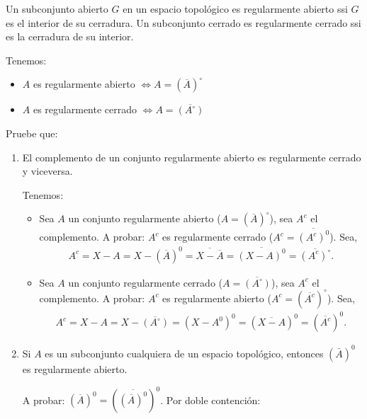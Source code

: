 \begin{problema}
    Un subconjunto abierto $G$ en un espacio topológico es regularmente abierto ssi $G$ es el interior de su cerradura. Un subconjunto cerrado es regularmente cerrado ssi es la cerradura de su interior. 
    \begin{cajita}
        Tenemos: 
        \begin{itemize}
            \item $A$ es regularmente abierto $\iff A= (\overline{A})^\circ$
            \item $A$ es regularmente cerrado $\iff A= \overline{(A^\circ)}$
        \end{itemize}
    \end{cajita}
    
    Pruebe que:
    \begin{enumerate}
        \item El complemento de un conjunto regularmente abierto es regularmente cerrado y viceversa.
        \begin{dem}
            Tenemos: 
            \begin{itemize}
                \item Sea $A$ un conjunto regularmente abierto ($A=(\overline{A})^\circ$), sea $A^c$ el complemento. A probar: $A^c$ es regularmente cerrado ($A^c=\overline{(A^c)^0}$). Sea, 
                \begin{align*}
                    A^c = X-A = X-(\overline{A})^0=\overline{X-\overline{A}}=\overline{(X-A)^0}=\overline{(A^c)^\circ}.
                \end{align*}
                \item Sea $A$ un conjunto regularmente cerrado ($A= \overline{(A^\circ)}$), sea $A^c$ el complemento. A probar: $A^c$ es regularmente abierto ($A^c= (\overline{A^c})^\circ$). Sea, 
                \begin{align*}
                    A^c=X-A=X-\overline{(A^\circ)} =(X-A^0)^0=(\overline{X-A})^0= (\overline{A^c})^0.
                \end{align*}
            \end{itemize}
        \end{dem}
        \item Si $A$ es un subconjunto cualquiera de un espacio topológico, entonces $(\bar{A})^0$ es regularmente abierto.
        \begin{dem}
            A probar: $(\overline{A})^0=(\overline{(\overline{A})^0})^0$.  Por doble contención: 
            \begin{itemize}

\end{itemize}
\end{dem}
\end{enumerate}
\end{problema}
